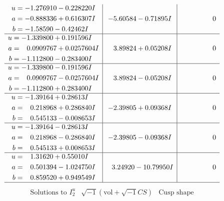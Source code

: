 \documentclass[1p]{elsarticle_modified}
\theoremstyle{definition}
\newcommand{\I}{\sqrt{-1}}
\begin{document}
$$\begin{array}{c|c|c}
\begin{aligned}
u &= -1.276910 - 0.228220 I \\
a &= -0.888336 + 0.616307 I \\
b &= -1.58590 - 0.42462 I\end{aligned}
 & -5.60584 - 0.71895 I & \phantom{-0.000000 } 0 \\ \hline\begin{aligned}
u &= -1.339800 + 0.191596 I \\
a &= \phantom{-}0.0909767 + 0.0257604 I \\
b &= -1.112800 - 0.283400 I\end{aligned}
 & \phantom{-}3.89824 + 0.05208 I & \phantom{-0.000000 } 0 \\ \hline\begin{aligned}
u &= -1.339800 - 0.191596 I \\
a &= \phantom{-}0.0909767 - 0.0257604 I \\
b &= -1.112800 + 0.283400 I\end{aligned}
 & \phantom{-}3.89824 - 0.05208 I & \phantom{-0.000000 } 0 \\ \hline\begin{aligned}
u &= -1.39164 + 0.28613 I \\
a &= \phantom{-}0.218968 + 0.286840 I \\
b &= \phantom{-}0.545133 - 0.008653 I\end{aligned}
 & -2.39805 + 0.09368 I & \phantom{-0.000000 } 0 \\ \hline\begin{aligned}
u &= -1.39164 - 0.28613 I \\
a &= \phantom{-}0.218968 - 0.286840 I \\
b &= \phantom{-}0.545133 + 0.008653 I\end{aligned}
 & -2.39805 - 0.09368 I & \phantom{-0.000000 } 0 \\ \hline\begin{aligned}
u &= \phantom{-}1.31620 + 0.55010 I \\
a &= \phantom{-}0.501394 - 1.024750 I \\
b &= \phantom{-}0.859520 + 0.949549 I\end{aligned}
 & \phantom{-}3.24920 - 10.79950 I & \phantom{-0.000000 } 0\\
 \hline 
 \end{array}$$\newpage$$\begin{array}{c|c|c}  
\text{Solutions to }I^u_{2}& \I (\text{vol} + \sqrt{-1}CS) & \text{Cusp shape}\\
 \hline 
\begin{aligned}

\end{aligned}
\end{array}$$
\end{document}
